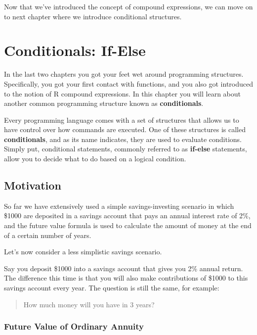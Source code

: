 \documentclass[
]{book}
\begin{document}
Now that we've introduced the concept of compound expressions, we can move on
to next chapter where we introduce conditional structures.

\hypertarget{conditionals}{%
\chapter{Conditionals: If-Else}\label{conditionals}}

In the last two chapters you got your feet wet around programming structures.
Specifically, you got your first contact with functions, and you also got
introduced to the notion of R compound expressions. In this chapter you will
learn about another common programming structure known as \textbf{conditionals}.

Every programming language comes with a set of structures that allows us to
have control over how commands are executed. One of these structures is called
\textbf{conditionals}, and as its name indicates, they are used to evaluate
conditions. Simply put, conditional statements, commonly referred to as
\textbf{if-else} statements, allow you to decide what to do based on a logical
condition.

\hypertarget{motivation-4}{%
\section{Motivation}\label{motivation-4}}

So far we have extensively used a simple savings-investing scenario in which
\$1000 are deposited in a savings account that pays an annual interest rate
of 2\%, and the future value formula is used to calculate the amount of money
at the end of a certain number of years.

Let's now consider a less simplistic savings scenario.

Say you deposit \$1000 into a savings account that gives you 2\% annual return.
The difference this time is that you will also make contributions of \$1000 to
this savings account every year. The question is still the same, for example:

\begin{quote}
How much money will you have in 3 years?
\end{quote}

\hypertarget{future-value-of-ordinary-annuity}{%
\subsection{Future Value of Ordinary Annuity}\label{future-value-of-ordinary-annuity}}
\end{document}
